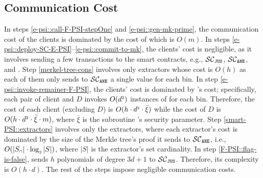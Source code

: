 


\vspace{-5mm}
\subsection{Communication Cost}

\vspace{-2mm}

In steps  \ref{e-psi::call-F-PSI-stepOne} and \ref{e-psi::gen-mk-prime}, the communication cost of the clients is dominated by the cost of \ct which is $O(m)$. In steps \ref{e-psi::deploy-SC-E-PSI}--\ref{e-psi::commit-to-mk}, the clients' cost is negligible, as it involves sending a few transactions to the smart contracts, e.g., $\mathcal{SC}_{\mathtt{JUS}}$, $\mathcal{SC}_{\mathtt{ANE}}$, and \SCpc. Step \ref{merkel-tree-cons} involves only extractors whose cost is $O(h)$ as each of them only sends to $\mathcal{SC}_{\mathtt{ANE}}$  a single value for each bin. In step \ref{e-psi::invoke-remainer-F-PSI}, the clients' cost is dominated by \vopr's cost; specifically, each pair of client and $D$ invokes $O(d^{\scriptscriptstyle 2})$ instances of \vopr for each bin. Therefore, the cost of each client (excluding $D$) is $O(h\cdot d^{\scriptscriptstyle 2}\cdot \bar\xi)$ while the cost of $D$ is $O(h\cdot d^{\scriptscriptstyle 2}\cdot \bar\xi\cdot m)$, where $\bar\xi$ is the subroutine \ole's security parameter. 
%
Step \ref{smart-PSI::extractors}  involves only the extractors, where each extractor's cost is dominated by the size of the Merkle tree's proof it sends to $\mathcal{SC}_{\mathtt{ANE}}$, i.e., $O(|S_{\scriptscriptstyle\cap}|\cdot \log_{\scriptscriptstyle 2}|S|)$, where $|S|$ is the extractor's set cardinality. 
%
In step \ref{F-PSI::flag-is-false}, \aud sends $h$ polynomials of degree $3d+1$ to $\mathcal{SC}_{\mathtt{JUS}}$. Therefore, its complexity is $O(h\cdot d)$. 
%
The rest of the steps impose negligible communication costs. 

\vspace{-4.5mm}
